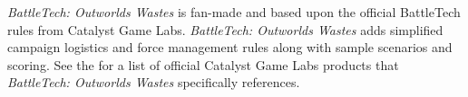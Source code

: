 \emph{BattleTech: Outworlds Wastes} is fan-made and based upon the official BattleTech rules from Catalyst Game Labs.
\emph{BattleTech: Outworlds Wastes} adds simplified campaign logistics and force management rules along with sample scenarios and scoring.
See the  for a list of official Catalyst Game Labs products that \emph{BattleTech: Outworlds Wastes} specifically references.

